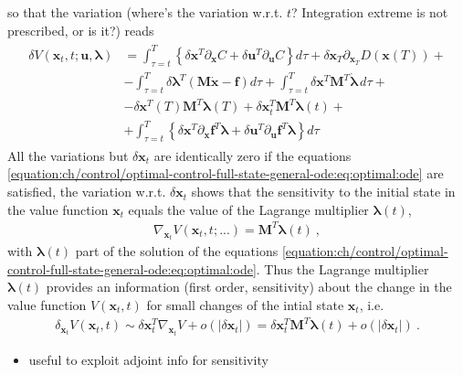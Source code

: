 \documentclass[letterpaper,10pt,english]{jupyterBook}
\begin{document}
\sphinxAtStartPar
so that the variation (where’s the variation w.r.t. \(t\)? Integration extreme is not prescribed, or is it?) reads
\begin{equation*}
\begin{split}\begin{aligned}
  \delta V(\mathbf{x}_t, t; \mathbf{u}, \boldsymbol\lambda)
  & = \int_{\tau=t}^{T} \left\{ \delta \mathbf{x}^T \partial_{\mathbf{x}} C + \delta \mathbf{u}^T \partial_{\mathbf{u}} C \right\} d \tau + \delta \mathbf{x}_T \partial_{\mathbf{x}_T} D(\mathbf{x}(T)) + \\
  & - \int_{\tau=t}^{T} \delta \boldsymbol\lambda^T ( \mathbf{M} \dot{\mathbf{x}} - \mathbf{f} ) d \tau + \int_{\tau=t}^T \delta \mathbf{x}^T \mathbf{M}^T \dot{\boldsymbol\lambda} \, d \tau + \\
  & - \delta \mathbf{x}^T(T) \mathbf{M}^T \boldsymbol\lambda(T) + \delta \mathbf{x}^T_t \mathbf{M}^T \boldsymbol\lambda(t) + \\
  & + \int_{\tau=t}^{T} \left\{ \delta \mathbf{x}^T \partial_{\mathbf{x}} \mathbf{f}^T \boldsymbol\lambda + \delta \mathbf{u}^T \partial_{\mathbf{u}} \mathbf{f}^T \boldsymbol\lambda \right\} d \tau
\end{aligned}\end{split}
\end{equation*}
\sphinxAtStartPar
All the variations but \(\delta \mathbf{x}_t\) are identically zero if the equations \eqref{equation:ch/control/optimal-control-full-state-general-ode:eq:optimal:ode} are satisfied, the variation w.r.t. \(\delta \mathbf{x}_t\) shows that the sensitivity to the initial state in the value function \(\mathbf{x}_t\) equals the value of the Lagrange multiplier \(\boldsymbol\lambda(t)\),
\begin{equation}\label{equation:ch/control/optimal-control-full-state-general-ode:eq:co-state:sensitivity}
\begin{split}\nabla_{\mathbf{x}_t} V(\mathbf{x}_t, t; ...) = \mathbf{M}^T \boldsymbol\lambda(t) \ ,\end{split}
\end{equation}
\sphinxAtStartPar
with \(\boldsymbol\lambda(t)\) part of the solution of the equations \eqref{equation:ch/control/optimal-control-full-state-general-ode:eq:optimal:ode}. Thus the Lagrange multiplier \(\boldsymbol\lambda(t)\) provides an information (first order, sensitivity) about the change in the value function \(V(\mathbf{x}_t, t)\) for small changes of the intial state \(\mathbf{x}_t\), i.e.
\begin{equation*}
\begin{split}\delta_{\mathbf{x}_t} V(\mathbf{x}_t, t) \sim \delta \mathbf{x}_t^T \nabla_{\mathbf{x}_t} V + o(|\delta \mathbf{x}_t|) =  \delta \mathbf{x}^T_t \mathbf{M}^T \boldsymbol\lambda(t) + o(|\delta \mathbf{x}_t|) \ .\end{split}
\end{equation*}
\sphinxAtStartPar
{}
\begin{itemize}
\item {} 
\sphinxAtStartPar
useful to exploit adjoint info for sensitivity

\end{itemize}
\end{document}
